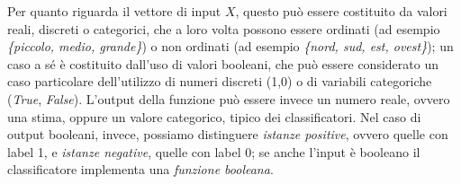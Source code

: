 \documentclass[oneside, openany]{book}
\begin{document}
		Per quanto riguarda il vettore di input $X$, questo può essere costituito da valori reali, discreti o categorici, che a loro volta possono essere ordinati (ad esempio \textit{\{piccolo, medio, grande\}}) o non ordinati (ad esempio \textit{\{nord, sud, est, ovest\}}); un caso a sé è costituito dall'uso di valori booleani, che può essere considerato un caso particolare dell'utilizzo di numeri discreti (1,0) o di variabili categoriche (\textit{True}, \textit{False}).\newline
		L'output della funzione può essere invece un numero reale, ovvero una stima, oppure un valore categorico, tipico dei classificatori. Nel caso di output booleani, invece, possiamo distinguere \textit{istanze positive}, ovvero quelle con label 1, e \textit{istanze negative}, quelle con label 0; se anche l'input è booleano il classificatore implementa una \textit{funzione booleana}.\\
		
\end{document}
